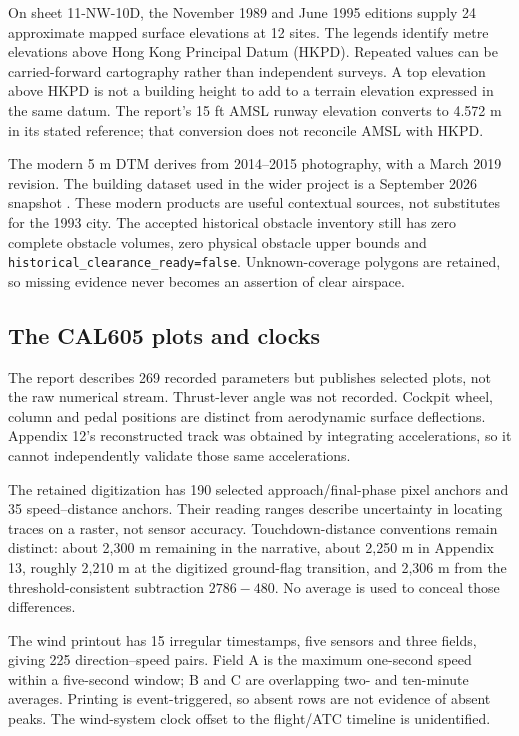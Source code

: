 On sheet 11-NW-10D, the November 1989 and June 1995 editions supply 24 approximate mapped surface elevations at 12 sites. The legends identify metre elevations above Hong Kong Principal Datum (HKPD). Repeated values can be carried-forward cartography rather than independent surveys. A top elevation above HKPD is not a building height to add to a terrain elevation expressed in the same datum. The report's 15 ft AMSL runway elevation converts to 4.572 m in its stated reference; that conversion does not reconcile AMSL with HKPD.

The modern 5 m DTM derives from 2014--2015 photography, with a March 2019 revision. The building dataset used in the wider project is a September 2026 snapshot \citep{dtm,buildings}. These modern products are useful contextual sources, not substitutes for the 1993 city. The accepted historical obstacle inventory still has zero complete obstacle volumes, zero physical obstacle upper bounds and \texttt{historical\_\allowbreak clearance\_\allowbreak ready=false}. Unknown-coverage polygons are retained, so missing evidence never becomes an assertion of clear airspace.

\subsection*{The CAL605 plots and clocks}
The report describes 269 recorded parameters but publishes selected plots, not the raw numerical stream. Thrust-lever angle was not recorded. Cockpit wheel, column and pedal positions are distinct from aerodynamic surface deflections. Appendix 12's reconstructed track was obtained by integrating accelerations, so it cannot independently validate those same accelerations.

The retained digitization has 190 selected approach/final-phase pixel anchors and 35 speed--distance anchors. Their reading ranges describe uncertainty in locating traces on a raster, not sensor accuracy. Touchdown-distance conventions remain distinct: about 2,300 m remaining in the narrative, about 2,250 m in Appendix 13, roughly 2,210 m at the digitized ground-flag transition, and 2,306 m from the threshold-consistent subtraction $2786-480$. No average is used to conceal those differences.

The wind printout has 15 irregular timestamps, five sensors and three fields, giving 225 direction--speed pairs. Field A is the maximum one-second speed within a five-second window; B and C are overlapping two- and ten-minute averages. Printing is event-triggered, so absent rows are not evidence of absent peaks. The wind-system clock offset to the flight/ATC timeline is unidentified.

